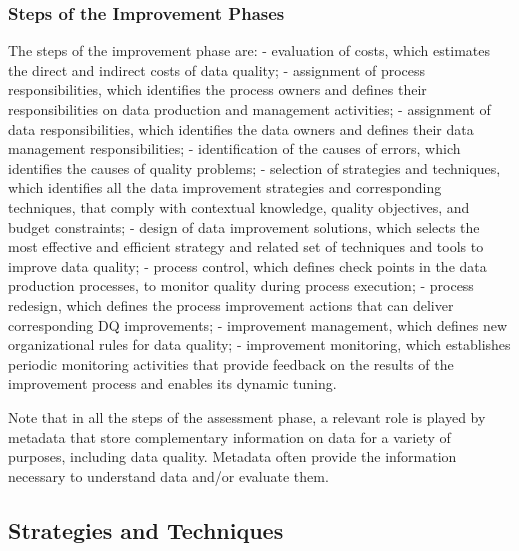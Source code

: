 \documentclass[pdftex,english,oribibl]{llncs}
\begin{document}
\subsubsection{Steps of the Improvement Phases}
The steps of the improvement phase are:
- evaluation of costs, which estimates the direct and indirect costs of data quality;
- assignment of process responsibilities, which identifies the process owners and defines their responsibilities on data production and management activities;
- assignment of data responsibilities, which identifies the data owners and defines their data management responsibilities;
- identification of the causes of errors, which identifies the causes of quality problems;
- selection of strategies and techniques, which identifies all the data improvement strategies and corresponding techniques, that comply with contextual knowledge, quality objectives, and budget constraints;
- design of data improvement solutions, which selects the most effective and efficient strategy and related set of techniques and tools to improve data quality;
- process control, which defines check points in the data production processes, to monitor quality during process execution;
- process redesign, which defines the process improvement actions that can deliver corresponding DQ improvements;
- improvement management, which defines new organizational rules for data quality;
- improvement monitoring, which establishes periodic monitoring activities that provide feedback on the results of the improvement process and enables its dynamic tuning.

Note that in all the steps of the assessment phase, a relevant role is played by metadata that store complementary information on data for a variety of purposes, including data quality. Metadata often provide the information necessary to understand data and/or evaluate them.

\subsection{Strategies and Techniques}
\end{document}
